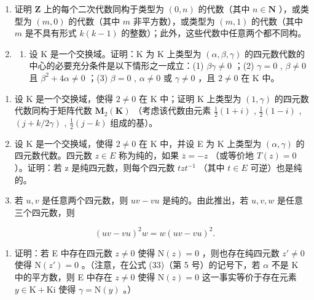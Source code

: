 \begin{enumerate}
\def\labelenumi{\arabic{enumi}.}
\setcounter{enumi}{1}
\item
  证明 \(\mathbf{Z}\) 上的每个二次代数同构于类型为 \((0, n)\) 的代数（其中 \(n \in \mathbf{N}\) ），或类型为 \((m, 0)\) 的代数（其中 \(m\) 非平方数），或类型为 \((m, 1)\) 的代数（其中 \(m\) 是不具有形式 \(k(k - 1)\) 的整数）；此外，这些代数中任意两个都不同构。
\item
  \begin{enumerate}
  \def\labelenumii{(\alph{enumii})}
  \tightlist
  \item
    设 K 是一个交换域。证明：K 为 K 上类型为 \((\alpha, \beta, \gamma)\) 的四元数代数的中心的必要充分条件是以下情形之一成立：(1) \(\beta\gamma \neq 0\) ；(2) \(\gamma = 0\) , \(\beta \neq 0\) 且 \(\beta^{2} + 4\alpha \neq 0\) ；(3) \(\beta = 0\) , \(\alpha \neq 0\) 或 \(\gamma \neq 0\) ，且 \(2 \neq 0\) 在 K 中。
  \end{enumerate}
\end{enumerate}

\begin{enumerate}
\def\labelenumi{(\alph{enumi})}
\setcounter{enumi}{1}
\item
  设 K 是一个交换域，使得 \(2 \neq 0\) 在 K 中；证明 K 上类型为 \((1, \gamma)\) 的四元数代数同构于矩阵代数 \(\mathbf{M}_{2}(\mathbf{K})\) （考虑该代数由元素 \(\frac{1}{2}(1 + i)\) , \(\frac{1}{2}(1 - i)\) , \((j + k/2\gamma)\) , \(\frac{1}{2}(j - k)\) 组成的基）。
\item
  设 K 是一个交换域，使得 \(2 \neq 0\) 在 K 中，并设 E 为 K 上类型为 \((\alpha, \gamma)\) 的四元数代数。四元数 \(z \in E\) 称为纯的，如果 \(\overline{z} = -z\) （或等价地 \(T(z) = 0\) ）。证明：若 z 是纯四元数，则每个四元数 \(tzt^{-1}\) （其中 \(t \in E\) 可逆）也是纯的。
\item
  若 \(u, v\) 是任意两个四元数，则 \(uv - vu\) 是纯的。由此推出，若 \(u, v, w\) 是任意三个四元数，则
\end{enumerate}

\[
(u v - v u) ^ {2} w = w (u v - v u) ^ {2}.
\]

\begin{enumerate}
\def\labelenumi{(\alph{enumi})}
\setcounter{enumi}{4}
\tightlist
\item
  证明：若 E 中存在四元数 \(z \neq 0\) 使得 \(\mathrm{N}(z) = 0\) ，则也存在纯四元数 \(z' \neq 0\) 使得 \(\mathrm{N}(z') = 0\) 。（注意，在公式 (33)（第 5 号）的记号下，若 \(\alpha\) 不是 K 中的平方数，则 E 中存在 \(z \neq 0\) 使得 \(\mathrm{N}(z) = 0\) 这一事实等价于存在元素 \(y \in \mathrm{K} + \mathrm{Ki}\) 使得 \(\gamma = \mathrm{N}(y)\) 。）
\end{enumerate}

